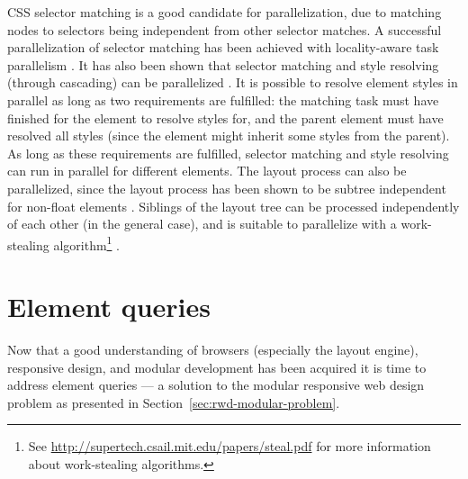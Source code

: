 \documentclass[a4paper,11pt]{kth-mag}
\begin{document}
        \gls{CSS} selector matching is a good candidate for parallelization, due to matching nodes to selectors being independent from other selector matches.
        A successful parallelization of selector matching has been achieved with locality-aware task parallelism \cite{parallelizing_the_web_browser}.
        It has also been shown that selector matching and style resolving (through cascading) can be parallelized \cite{zoomm}.
        It is possible to resolve \gls{element} styles in parallel as long as two requirements are fulfilled: the matching task must have finished for the \gls{element} to resolve styles for, and the parent \gls{element} must have resolved all styles (since the \gls{element} might inherit some styles from the parent).
        As long as these requirements are fulfilled, selector matching and style resolving can run in parallel for different \glspl{element}.
        The layout process can also be parallelized, since the layout process has been shown to be subtree independent for non-float \glspl{element} \cite{servo_parallel,servo_blog}.
        Siblings of the layout tree can be processed independently of each other (in the general case), and is suitable to parallelize with a work-stealing algorithm\footnote{See \url{http://supertech.csail.mit.edu/papers/steal.pdf} for more information about work-stealing algorithms.} \cite{meyerovich2010fast}.


  \chapter{Element queries}\label{ch:eq}
    Now that a good understanding of \glspl{browser} (especially the \gls{layout engine}), \gls{responsive} design, and modular development has been acquired it is time to address element queries --- a solution to the modular \gls{responsive} \gls{web} design problem as presented in Section~\ref{sec:rwd-modular-problem}.
    
\end{document}
